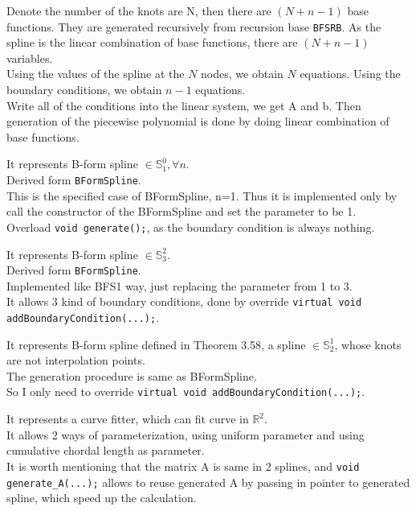 \documentclass[a4paper]{article}
\begin{document}
\begin{description}
  Denote the number of the knots are N, then there are $(N+n-1)$ base functions. They are generated recursively from recursion base \texttt{BFSRB}.
  As the spline is the linear combination of base functions, there are $(N+n-1)$ variables.\\
  Using the values of the spline at the \(N\) nodes, we obtain \(N\) equations. 
  Using the boundary conditions, we obtain \(n-1\) equations.\\
  Write all of the conditions into the linear system, we get A and b. 
  Then generation of the piecewise polynomial is done by doing linear combination of base functions.
  \item[BFS1]
  It represents B-form spline $\in \mathbb{S}_1^0, \forall n$.\\
  Derived form \texttt{BFormSpline}.\\
  This is the specified case of BFormSpline, n=1. Thus it is implemented only by call the constructor of the BFormSpline and set the parameter to be 1.\\
  Overload \texttt{void generate();}, as the boundary condition is always nothing.
  \item[BFS3]
  It represents B-form spline $\in \mathbb{S}_3^2$.\\ 
  Derived form \texttt{BFormSpline}.\\
  Implemented like BFS1 way, just replacing the parameter from 1 to 3.\\
  It allows 3 kind of boundary conditions, done by override \texttt{virtual void addBoundaryCondition(...);}.\\
  \item[BFS\_Thm\_3\_58]
  It represents B-form spline defined in Theorem 3.58\cite*{Thm_3_58}, a spline $\in \mathbb{S}_2^1$, whose knots are not interpolation points.\\ 
  The generation procedure is same as BFormSpline.\\
  So I only need to override \texttt{virtual void addBoundaryCondition(...);}.
  \item[CurveFitter]
  It represents a curve fitter, which can fit curve in \(\mathbb{R}^2\). \\
  It allows 2 ways of parameterization, using uniform parameter and using cumulative chordal length as parameter.\\
  It is worth mentioning that the matrix A is same in 2 splines, 
  and \texttt{void generate\_A(...);} allows to reuse generated A by passing in pointer to generated spline, 
  which speed up the calculation.\\

\end{description}
\end{document}
